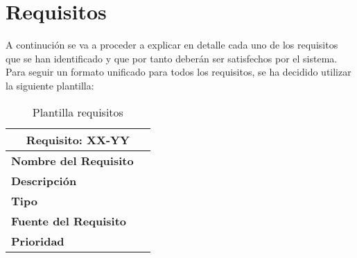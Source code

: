 \section{Requisitos}
\par A continución se va a proceder a explicar en detalle cada uno de los requisitos que se han identificado y que por tanto deberán ser satisfechos por el sistema. Para seguir un formato unificado para todos los requisitos, se ha decidido utilizar la siguiente plantilla:
\begin{table}[H]
\begin{center}
\begin{tabular}{p{} p{7cm}}
\multicolumn{2}{c}{\textbf{Requisito: XX-YY} } \\
\hline \hline
\textbf{Nombre del Requisito} &   \\
\hline
\textbf{Descripción} &  \\
\hline
\textbf{Tipo} &   \\
\hline
\textbf{Fuente del Requisito} &   \\
\hline
\textbf{Prioridad} &   \\ \hline
\end{tabular}
\caption{Plantilla requisitos}
\label{tab:Plantilla-Requisitos}
\end{center}
\end{table}

